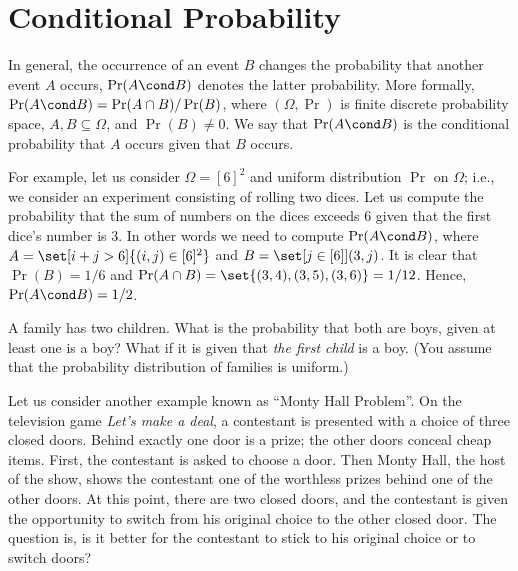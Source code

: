 \chapter{Conditional Probability}
In general, the occurrence of an event $B$ changes the probability that another
event $A$ occurs, $\Pr(A \cond B)$ denotes the latter probability. More
formally, $\Pr(A \cond B) = \Pr(A \cap B) / \Pr(B)$, where $(\Omega, \Pr)$ is
finite discrete probability space, $A, B \subseteq \Omega$, and $\Pr(B) \neq 0$. 
We say that $\Pr(A \cond B)$ is the conditional probability that $A$ occurs
given that $B$ occurs.

For example, let us consider $\Omega = [6]^2$ and uniform distribution $\Pr$ on
$\Omega$; i.e., we consider an experiment consisting of rolling two dices. Let
us compute the probability that the sum of numbers on the dices exceeds $6$
given that the first dice's number is $3$. In other words we need to compute
$\Pr(A \cond B)$, where $A = \set[i + j > 6]{(i, j) \in [6]^2}$ and 
$B = \set[{j \in [6]}]{(3, j)}$. It is clear that $\Pr(B) = 1 / 6$ and 
$\Pr(A \cap B) = \set{(3, 4), (3, 5), (3, 6)} = 1 / 12$. Hence, $\Pr(A \cond B)
= 1 / 2$.

\begin{exercise}
  A family has two children. What is the probability that both are boys, given
  at least one is a boy? What if it is given that \emph{the first child} is a
  boy. (You assume that the probability distribution of families is uniform.)
\end{exercise}

Let us consider another example known as ``Monty Hall Problem''. On the
television game \emph{Let’s make a deal}, a contestant is presented with a
choice of three closed doors. Behind exactly one door is a prize; the other
doors conceal cheap items. First, the contestant is asked to choose a door. Then
Monty Hall, the host of the show,  shows the contestant one of the worthless
prizes behind one of the other doors. At this point, there are two closed
doors, and the contestant is given the opportunity to switch from his original
choice to the other closed door. The question is, is it better for the
contestant to stick to his original choice or to switch doors?


